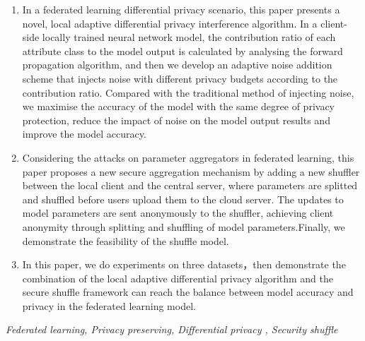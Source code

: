 \begin{enumerate}
	\item In a federated learning differential privacy scenario, this paper presents a novel, local adaptive differential privacy interference algorithm. In a client-side locally trained neural network model, the contribution ratio of each attribute class to the model output is calculated by analysing the forward propagation algorithm, and then we develop an adaptive noise addition scheme that injects noise with different privacy budgets according to the contribution ratio. Compared with the traditional method of injecting noise, we maximise the accuracy of the model with the same degree of privacy protection, reduce the impact of noise on the model output results and improve the model accuracy.
	\item Considering the attacks on parameter aggregators in federated learning, this paper proposes a new secure aggregation mechanism by adding a new shuffler between the local client and the central server, where parameters are splitted and shuffled before users upload them to the cloud server. The updates to model parameters are sent anonymously to the shuffler, achieving client anonymity through splitting and shuffling of model parameters.Finally, we demonstrate the feasibility of the shuffle model.
	\item In this paper, we do experiments on three datasets，then demonstrate the combination of the local adaptive differential privacy algorithm and the secure shuffle framework can reach the balance between model accuracy and privacy in the federated learning model.
\end{enumerate}
{} \textit{Federated learning, Privacy preserving, Differential privacy , Security shuffle}


